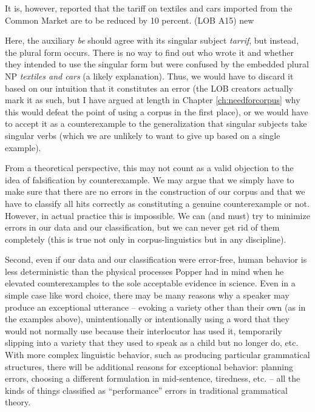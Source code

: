 \begin{exe}
\ex It is, however, reported that the tariff on textiles and cars imported from the Common Market are to be reduced by 10 percent. (LOB A15)
\label{ex:tariffare} new
\end{exe}

Here, the auxiliary \textit{be} should agree with its singular subject \textit{tarrif}, but instead, the plural form occurs. There is no way to find out who wrote it and whether they intended to use the singular form but were confused by the embedded plural NP \textit{textiles and cars} (a likely explanation). Thus, we would have to discard it based on our intuition that it constitutes an error (the LOB creators actually mark it as such, but I have argued at length in Chapter \ref{ch:needforcorpus} why this would defeat the point of using a corpus in the first place), or we would have to accept it as a counterexample to the generalization that singular subjects take singular verbs (which we are unlikely to want to give up based on a single example).

From a theoretical perspective, this may not count as a valid objection to the idea of falsification by counterexample. We may argue that we simply have to make sure that there are no errors in the construction of our corpus and that we have to classify all hits correctly as constituting a genuine counterexample or not. However, in actual practice this is impossible. We can (and must) try to minimize errors in our data and our classification, but we can never get rid of them completely (this is true not only in corpus-linguistics but in any discipline).

Second, even if our data and our classification were error-free, human behavior is less deterministic than the physical processes Popper had in mind when he elevated counterexamples to the sole acceptable evidence in science. Even in a simple case like word choice, there may be many reasons why a speaker may produce an exceptional utterance -- evoking a variety other than their own (as in the examples above), unintentionally or intentionally using a word that they would not normally use because their interlocutor has used it, temporarily slipping into a variety that they used to speak as a child but no longer do, etc. With more complex linguistic behavior, such as producing particular grammatical structures, there will be additional reasons for exceptional behavior: planning errors, choosing a different formulation in mid-sentence, tiredness, etc. -- all the kinds of things classified as ``performance'' errors in traditional grammatical theory.


